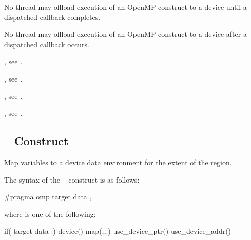 \restrictions
No thread may offload execution of an OpenMP construct to a device until a
dispatched  callback completes.

No thread may offload execution of an OpenMP construct to a device after a
dispatched  callback occurs.

\begin{crossrefs}
\item {}, see
.

\item {}, see
.

\item {}, see
.

\item {}, see
.
\end{crossrefs}


\subsection{~ Construct}
\label{subsec:target data Construct}
\summary
Map variables to a device data environment for the extent of the region.

\syntax
\begin{ccppspecific}
The syntax of the ~ construct is as follows:

\begin{ompcPragma}
#pragma omp target data \plc{clause[ [ [},\plc{] clause] ... ] new-line}
\end{ompcPragma}

\begin{samepage}
where  is one of the following:

\begin{indentedcodelist}
if(\plc{[} target data :\plc{] scalar-expression})
device()
map(\plc{[[map-type-modifier[},\plc{] [map-type-modifier[},\plc{] ...] map-type}:\plc{ ] locator-list})
use_device_ptr()
use_device_addr()
\end{indentedcodelist}
\end{samepage}
\end{ccppspecific}
\medskip

